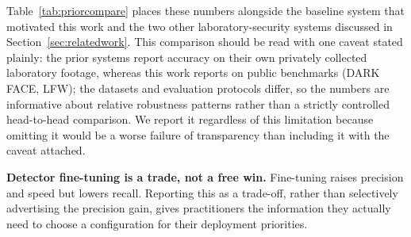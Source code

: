 \documentclass[conference]{IEEEtran}
\begin{document}
Table~\ref{tab:priorcompare} places these numbers alongside the
baseline system that motivated this work and the two other
laboratory-security systems discussed in
Section~\ref{sec:relatedwork}. This
comparison should be read with one caveat stated plainly: the
prior systems report accuracy on their own privately collected
laboratory footage, whereas this work reports on public
benchmarks (DARK FACE, LFW); the datasets and evaluation
protocols differ, so the numbers are informative about relative
robustness patterns rather than a strictly controlled
head-to-head comparison. We report it regardless of this
limitation because omitting it would be a worse failure of
transparency than including it with the caveat attached.

\begin{table}[!t]
\caption{Quantitative Comparison with Prior Laboratory-Security Systems}
\label{tab:priorcompare}
\centering
{}
\end{table}

\textbf{Detector fine-tuning is a trade, not a free win.}
Fine-tuning raises precision and speed but lowers recall.
Reporting this as a trade-off, rather than selectively
advertising the precision gain, gives practitioners the
information they actually need to choose a configuration for
their deployment priorities.
\end{document}
